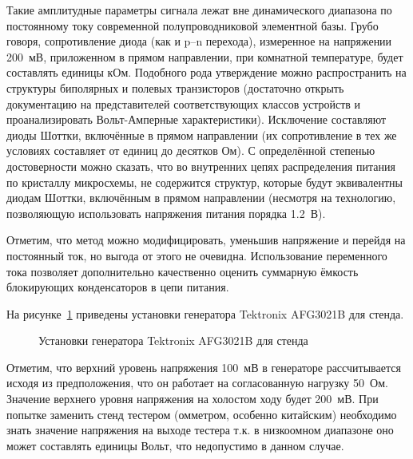 Такие амплитудные параметры сигнала лежат вне динамического диапазона по постоянному току современной полупроводниковой элементной базы. Грубо говоря, сопротивление диода (как и p--n перехода), измеренное на напряжении 200~мВ, приложенном в прямом направлении, при комнатной температуре, будет составлять единицы кОм. Подобного рода утверждение можно распространить на структуры биполярных и полевых транзисторов (достаточно открыть документацию на представителей соответствующих классов устройств и проанализировать Вольт-Амперные характеристики). Исключение составляют диоды Шоттки, включённые в прямом направлении (их сопротивление в тех же условиях составляет от единиц до десятков Ом). С определённой степенью достоверности можно сказать, что во внутренних цепях распределения питания по кристаллу микросхемы, не содержится структур, которые будут эквивалентны диодам Шоттки, включённым в прямом направлении (несмотря на технологию, позволяющую использовать напряжения питания порядка 1.2~В).
 
Отметим, что метод можно модифицировать, уменьшив напряжение и перейдя на постоянный ток, но выгода от этого не очевидна. Использование переменного тока позволяет дополнительно качественно оценить суммарную ёмкость блокирующих конденсаторов в цепи питания.

На рисунке~\ref{p:report_powe_tuning_generator} приведены установки генератора Tektronix AFG3021B для стенда. 

\begin{figure}[H]
  \captionsetup{singlelinecheck=true} %
  \caption{Установки генератора Tektronix AFG3021B для стенда} \label{p:report_powe_tuning_generator}
\end{figure}

Отметим, что верхний уровень напряжения 100~мВ в генераторе рассчитывается исходя из предположения, что он работает на согласованную нагрузку 50~Ом. Значение верхнего уровня напряжения на холостом ходу будет 200~мВ. При попытке заменить стенд тестером (омметром, особенно китайским) необходимо знать значение напряжения на выходе тестера т.к. в низкоомном диапазоне оно может составлять единицы Вольт, что недопустимо в данном случае.

